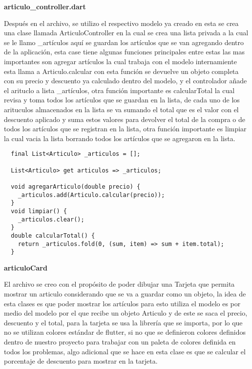 \textbf{articulo\_controller.dart}

Después en el archivo, se utilizo el respectivo modelo ya creado en esta se crea una clase llamada ArticuloController en la cual se crea una lista privada a la cual se le llamo \_artículos aquí se guardan los artículos que se van agregando dentro de la aplicación, esta case tiene algunas funciones principales entre estas las mas importantes son agregar artículos la cual trabaja con el modelo internamiente esta llama a Articulo.calcular con esta función se devuelve un objeto completa con su precio y descuento ya calculado dentro del modelo, y el controlador añade el arituclo a lista \_artículos, otra función importante es calcularTotal la cual revisa y toma todos los artículos que se guardan en la lista, de cada uno de los arituculos almacenados en la lista se va sumando el total que es el valor con el descuento aplicado y suma estos valores para devolver el total de la compra o de todos los artículos que se registran en la lista, otra función importante es limpiar la cual vacia la lista borrando todos los artículos que se agregaron en la lista.


\begin{center}
\begin{lstlisting}
  final List<Articulo> _articulos = [];
  
  List<Articulo> get articulos => _articulos;
  
  void agregarArticulo(double precio) {
    _articulos.add(Articulo.calcular(precio));
  }
  void limpiar() {
    _articulos.clear();
  }
  double calcularTotal() {
    return _articulos.fold(0, (sum, item) => sum + item.total);
  }
\end{lstlisting}
\end{center}

\textbf{articuloCard}

El archivo se creo con el propósito de poder dibujar una Tarjeta que permita mostrar un articulo considerando que se va a guardar como un objeto, la idea de esta clases es que poder mostrar los artículos para esto utiliza el modelo es por medio del modelo por el que recibe un objeto Articulo y de este se saca el precio, descuento y el total, para la tarjeta se usa la librería que se importa, por lo que no se utilizan colores estándar de flutter, si no que se definieron colores definidos dentro de nuestro proyecto para trabajar con un paleta de colores definida en todos los problemas, algo adicional que se hace en esta clase es que se calcular el porcentaje de descuento para mostrar en la tarjeta.

